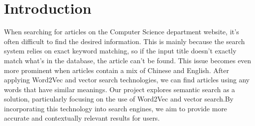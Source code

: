 \section{Introduction}

When searching for articles on the Computer Science department website, it’s often difficult to find the desired information. This is mainly because the search system relies on exact keyword matching, so if the input title doesn’t exactly match what’s in the database, the article can’t be found. This issue becomes even more prominent when articles contain a mix of Chinese and English.
After applying Word2Vec and vector search technologies, we can find articles using any words that have similar meanings. Our project explores semantic search as a solution, particularly focusing on the use of Word2Vec and vector search.By incorporating this technology into search engines, we aim to provide more accurate and contextually relevant results for users.